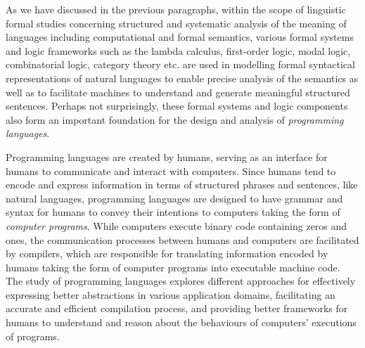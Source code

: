 As we have discussed in the previous paragraphs, within the scope of linguistic formal studies concerning structured and systematic analysis of the meaning of languages including computational and formal semantics, various formal systems and logic frameworks such as the lambda calculus, first-order logic, modal logic, combinatorial logic, category theory etc. are used in modelling formal syntactical representations of natural languages to enable precise analysis of the semantics as well as to facilitate machines to understand and generate meaningful structured sentences. Perhaps not surprisingly, these formal systems and logic components also form an important foundation for the design and analysis of \emph{programming languages}.

Programming languages are created by humans, serving as an interface for humans to communicate and interact with computers. Since humans tend to encode and express information in terms of structured phrases and sentences, like natural languages, programming languages are designed to have grammar and syntax for humans to convey their intentions to computers taking the form of \emph{computer programs}. While computers execute binary code containing zeros and ones, the communication processes between humans and computers are facilitated by compilers, which are responsible for translating information encoded by humans taking the form of computer programs into executable machine code. The study of programming languages explores different approaches for effectively expressing better abstractions in various application domains, facilitating an accurate and efficient compilation process, and providing better frameworks for humans to understand and reason about the behaviours of computers' executions of programs.



